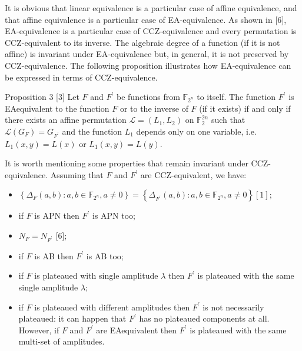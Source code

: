 \documentclass[10pt]{article}
\begin{document}
It is obvious that linear equivalence is a particular case of affine equivalence, and that affine equivalence is a particular case of EA-equivalence. As shown in [6], EA-equivalence is a particular case of CCZ-equivalence and every permutation is CCZ-equivalent to its inverse. The algebraic degree of a function (if it is not affine) is invariant under EA-equivalence but, in general, it is not preserved by CCZ-equivalence. The following proposition illustrates how EA-equivalence can be expressed in terms of CCZ-equivalence.

Proposition 3 [3] Let $F$ and $F^{\prime}$ be functions from $\mathbb{F}_{2^{n}}$ to itself. The function $F^{\prime}$ is EAequivalent to the function $F$ or to the inverse of $F$ (if it exists) if and only if there exists an affine permutation $\mathcal{L}=\left(L_{1}, L_{2}\right)$ on $\mathbb{F}_{2}^{2 n}$ such that $\mathcal{L}\left(G_{F}\right)=G_{F^{\prime}}$ and the function $L_{1}$ depends only on one variable, i.e. $L_{1}(x, y)=L(x)$ or $L_{1}(x, y)=L(y)$.

It is worth mentioning some properties that remain invariant under CCZ-equivalence. Assuming that $F$ and $F^{\prime}$ are CCZ-equivalent, we have:

\begin{itemize}
  \item $\left\{\Delta_{F}(a, b): a, b \in \mathbb{F}_{2^{n}}, a \neq 0\right\}=\left\{\Delta_{F^{\prime}}(a, b): a, b \in \mathbb{F}_{2^{n}}, a \neq 0\right\}[1]$;
  \item if $F$ is APN then $F^{\prime}$ is APN too;
  \item $N_{F}=N_{F^{\prime}}$ [6];
  \item if $F$ is AB then $F^{\prime}$ is AB too;
  \item if $F$ is plateaued with single amplitude $\lambda$ then $F^{\prime}$ is plateaued with the same single amplitude $\lambda$;
  \item if $F$ is plateaued with different amplitudes then $F^{\prime}$ is not necessarily plateaued: it can happen that $F^{\prime}$ has no plateaued components at all. However, if $F$ and $F^{\prime}$ are EAequivalent then $F^{\prime}$ is plateaued with the same multi-set of amplitudes.
\end{itemize}
\end{document}
